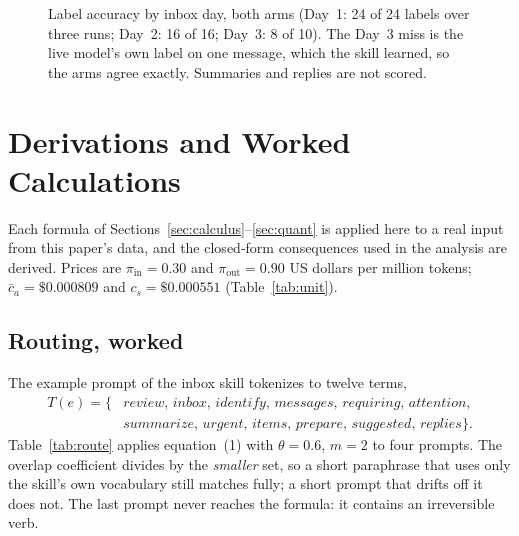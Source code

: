 \documentclass[11pt]{article}
\begin{document}
\begin{figure}[!htbp]
\centering
{}
\caption{Label accuracy by inbox day, both arms (Day~1: 24 of 24 labels over three runs; Day~2: 16 of 16; Day~3: 8 of
10). The Day~3 miss is the live model's own label on one message, which the skill learned, so the arms agree
exactly. Summaries and replies are not scored.}
\label{fig:acc}
\end{figure}

\section{Derivations and Worked Calculations}\label{sec:derive}

Each formula of Sections~\ref{sec:calculus}--\ref{sec:quant} is applied here to a real input from this paper's data,
and the closed-form consequences used in the analysis are derived. Prices are $\pi_\text{in}=0.30$ and
$\pi_\text{out}=0.90$ US dollars per million tokens; $\bar c_a=\$0.000809$ and $c_s=\$0.000551$ (Table~\ref{tab:unit}).

\subsection{Routing, worked}
The example prompt of the inbox skill tokenizes to twelve terms,
\[
\begin{aligned}T(e)=\{&\textit{review, inbox, identify, messages, requiring, attention,}\\ &\textit{summarize, urgent, items, prepare, suggested, replies}\}.\end{aligned}
\]
Table~\ref{tab:route} applies equation~(1) with $\theta=0.6$, $m=2$ to four prompts. The overlap coefficient divides by
the \emph{smaller} set, so a short paraphrase that uses only the skill's own vocabulary still matches fully; a short
prompt that drifts off it does not. The last prompt never reaches the formula: it contains an irreversible verb.
\end{document}
